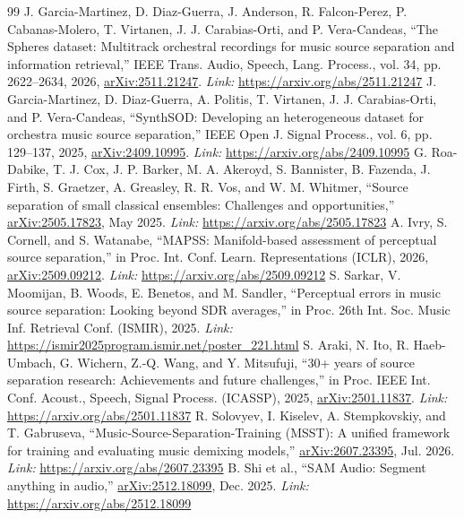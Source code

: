 \documentclass[12pt,a4paper]{article}
\begin{document}
\begin{thebibliography}{99}
 J. Garcia-Martinez, D. Diaz-Guerra, J. Anderson, R. Falcon-Perez, P. Cabanas-Molero, T. Virtanen, J. J. Carabias-Orti, and P. Vera-Candeas, ``The Spheres dataset: Multitrack orchestral recordings for music source separation and information retrieval,'' IEEE Trans. Audio, Speech, Lang. Process., vol. 34, pp. 2622--2634, 2026, \href{https://arxiv.org/abs/2511.21247}{arXiv:2511.21247}. \newline\textit{Link:} \url{https://arxiv.org/abs/2511.21247}
 J. Garcia-Martinez, D. Diaz-Guerra, A. Politis, T. Virtanen, J. J. Carabias-Orti, and P. Vera-Candeas, ``SynthSOD: Developing an heterogeneous dataset for orchestra music source separation,'' IEEE Open J. Signal Process., vol. 6, pp. 129--137, 2025, \href{https://arxiv.org/abs/2409.10995}{arXiv:2409.10995}. \newline\textit{Link:} \url{https://arxiv.org/abs/2409.10995}
 G. Roa-Dabike, T. J. Cox, J. P. Barker, M. A. Akeroyd, S. Bannister, B. Fazenda, J. Firth, S. Graetzer, A. Greasley, R. R. Vos, and W. M. Whitmer, ``Source separation of small classical ensembles: Challenges and opportunities,'' \href{https://arxiv.org/abs/2505.17823}{arXiv:2505.17823}, May 2025. \newline\textit{Link:} \url{https://arxiv.org/abs/2505.17823}
 A. Ivry, S. Cornell, and S. Watanabe, ``MAPSS: Manifold-based assessment of perceptual source separation,'' in Proc. Int. Conf. Learn. Representations (ICLR), 2026, \href{https://arxiv.org/abs/2509.09212}{arXiv:2509.09212}. \newline\textit{Link:} \url{https://arxiv.org/abs/2509.09212}
 S. Sarkar, V. Moomijan, B. Woods, E. Benetos, and M. Sandler, ``Perceptual errors in music source separation: Looking beyond SDR averages,'' in Proc. 26th Int. Soc. Music Inf. Retrieval Conf. (ISMIR), 2025. \newline\textit{Link:} \url{https://ismir2025program.ismir.net/poster_221.html}
 S. Araki, N. Ito, R. Haeb-Umbach, G. Wichern, Z.-Q. Wang, and Y. Mitsufuji, ``30+ years of source separation research: Achievements and future challenges,'' in Proc. IEEE Int. Conf. Acoust., Speech, Signal Process. (ICASSP), 2025, \href{https://arxiv.org/abs/2501.11837}{arXiv:2501.11837}. \newline\textit{Link:} \url{https://arxiv.org/abs/2501.11837}
 R. Solovyev, I. Kiselev, A. Stempkovskiy, and T. Gabruseva, ``Music-Source-Separation-Training (MSST): A unified framework for training and evaluating music demixing models,'' \href{https://arxiv.org/abs/2607.23395}{arXiv:2607.23395}, Jul. 2026. \newline\textit{Link:} \url{https://arxiv.org/abs/2607.23395}
 B. Shi et al., ``SAM Audio: Segment anything in audio,'' \href{https://arxiv.org/abs/2512.18099}{arXiv:2512.18099}, Dec. 2025. \newline\textit{Link:} \url{https://arxiv.org/abs/2512.18099}
\end{thebibliography}
\end{document}
